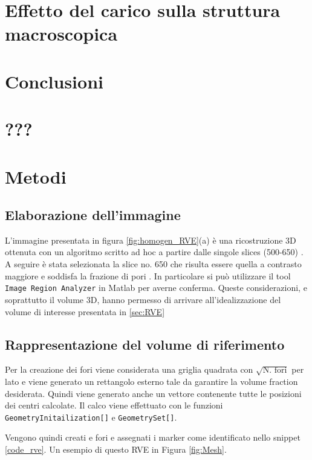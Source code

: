 \documentclass[a4paper,num-refs]{oup-contemporary}
\begin{document}
\section{Effetto del carico sulla struttura macroscopica}

\textcolor{blue}{\lipsum[1-8]}

\section{Conclusioni}

\section{???}


\section{Metodi}

\subsection{Elaborazione dell'immagine}

L'immagine presentata in figura \ref{fig:homogen_RVE}(a) è una ricostruzione 3D ottenuta con un algoritmo scritto ad hoc \citep{Mastrofini:21} a partire dalle singole slices (500-650) \citep{ESA:2005}. A seguire è stata selezionata la slice no. 650 che risulta essere quella a contrasto maggiore e soddisfa la frazione di pori \citep{CC21}. In particolare si può utilizzare il tool 
\texttt{Image Region Analyzer} in Matlab per averne conferma. Queste considerazioni, e soprattutto il volume 3D, hanno permesso di arrivare all'idealizzazione del volume di interesse presentata in  \cref{sec:RVE}

\subsection{Rappresentazione del volume di riferimento}
\label{sec:RVE_code}

Per la creazione dei fori viene considerata una griglia quadrata con $\sqrt{\text{N. fori}}$ per lato e viene generato un rettangolo esterno tale da garantire la volume fraction desiderata. Quindi viene generato anche un vettore contenente tutte le posizioni dei centri calcolate. Il calco viene effettuato con le funzioni \texttt{GeometryInitailization[]} e \texttt{GeometrySet[]}.

Vengono quindi creati e fori e assegnati i marker come identificato nello snippet \ref{code_rve}.  Un esempio di questo RVE in Figura \ref{fig:Mesh}.
\end{document}

